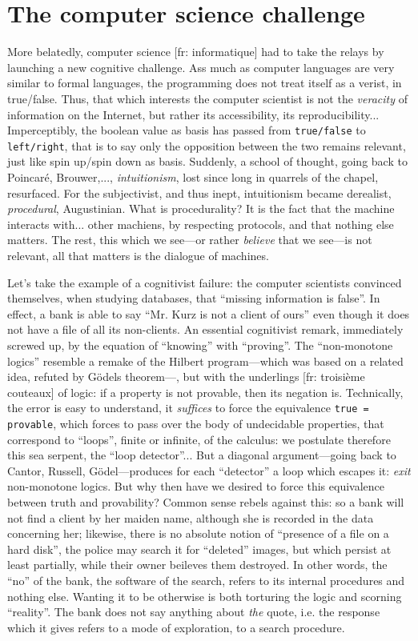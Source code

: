 \documentclass{article}
\begin{document}
\section{The computer science challenge}
More belatedly, computer science [fr: informatique] had to take the relays by launching a new cognitive challenge. Ass much as computer languages are very similar to formal languages, the programming does not treat itself as a verist, in true/false. Thus, that which interests the computer scientist is not the \emph{veracity} of information on the Internet, but rather its accessibility, its reproducibility... Imperceptibly, the boolean value as basis has passed from \texttt{true/false} to \texttt{left/right}, that is to say only the opposition between the two remains relevant, just like spin up/spin down as basis. Suddenly, a school of thought, going back to Poincaré, Brouwer,..., \emph{intuitionism}, lost since long in quarrels of the chapel, resurfaced. For the subjectivist, and thus inept, intuitionism became derealist, \emph{procedural}, Augustinian. What is procedurality? It is the fact that the machine interacts with... other machiens, by respecting protocols, and that nothing else matters. The rest, this which we see---or rather \emph{believe} that we see---is not relevant, all that matters is the dialogue of machines.

Let's take the example of a cognitivist failure: the computer scientists convinced themselves, when studying databases, that \enquote{missing information is false}. In effect, a bank is able to say \enquote{Mr. Kurz is not a client of ours} even though it does not have a file of all its non-clients. An essential cognitivist remark, immediately screwed up, by the equation of \enquote{knowing} with \enquote{proving}. The \enquote{non-monotone logics} resemble a remake of the Hilbert program---which was based on a related idea, refuted by Gödels theorem---, but with the underlings [fr: troisième couteaux] of logic: if a property is not provable, then its negation is. Technically, the error is easy to understand, it \emph{suffices} to force the equivalence \texttt{true = provable}, which forces to pass over the body of undecidable properties, that correspond to \enquote{loops}, finite or infinite, of the calculus: we postulate therefore this sea serpent, the \enquote{loop detector}... But a diagonal argument---going back to Cantor, Russell, Gödel---produces for each \enquote{detector} a loop which escapes it: \emph{exit} non-monotone logics. But why then have we desired to force this equivalence between truth and provability? Common sense rebels against this: so a bank will not find a client by her maiden name, although she is recorded in the data concerning her; likewise, there is no absolute notion of \enquote{presence of a file on a hard disk}, the police may search it for \enquote{deleted} images, but which persist at least partially, while their owner beileves them destroyed. In other words, the \enquote{no} of the bank, the software of the search, refers to its internal procedures and nothing else. Wanting it to be otherwise is both torturing the logic and scorning \enquote{reality}. The bank does not say anything about \emph{the} quote, i.e. the response which it gives refers to a mode of exploration, to a search procedure.
\end{document}
